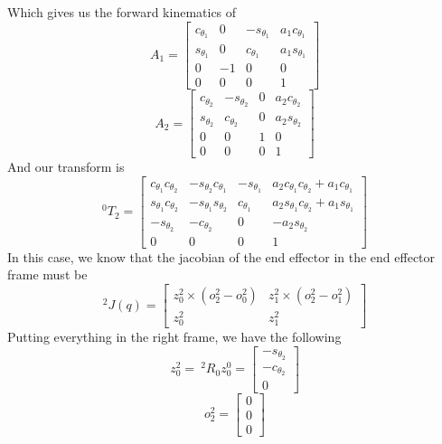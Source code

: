 \documentclass{../homework}
\begin{document}
\begin{solution}
\begin{parts}
     Which gives us the forward kinematics of
     \[
       A_1 = 
       \begin{bmatrix}
         c_{\theta_1} & 0 & -s_{\theta_1} & a_1c_{\theta_1} \\
         s_{\theta_1} & 0 & c_{\theta_1} & a_1s_{\theta_1} \\
         0 & -1 & 0 & 0 \\
         0 & 0 & 0 & 1
       \end{bmatrix}
     \]
     \[
       A_2 =
       \begin{bmatrix}
         c_{\theta_2} & -s_{\theta_2} & 0 & a_2c_{\theta_2} \\
         s_{\theta_2} & c_{\theta_2} & 0 & a_2s_{\theta_2} \\
         0 & 0 & 1 & 0 \\
         0 & 0 & 0 & 1
       \end{bmatrix}
     \]
     And our transform is
     \[
       ^0T_2 = 
       \begin{bmatrix}
         c_{\theta_1}c_{\theta_2} & -s_{\theta_2}c_{\theta_1} & - s_{\theta_1} & a_2c_{\theta_1}c_{\theta_2} + a_1c_{\theta_1} \\
         s_{\theta_1}c_{\theta_2} & -s_{\theta_1}s_{\theta_2} & c_{\theta_1} & a_2s_{\theta_1}c_{\theta_2} + a_1s_{\theta_1} \\
         -s_{\theta_2} & -c_{\theta_2} & 0 & -a_2s_{\theta_2} \\
         0 & 0 & 0 & 1
       \end{bmatrix}
     \]
     In this case, we know that the jacobian of the end effector in the end effector frame must be
     \[
      ^2J(q) = 
      \begin{bmatrix}
        z_0^2 \times (o^2_2 - o^2_0) & z_1^2 \times (o^2_2 - o^2_1) \\
        z_0^2 & z_1^2
      \end{bmatrix}
     \]
     Putting everything in the right frame, we have the following
     \[
       z_0^2 =\ ^2R_0z_0^0 =
       \begin{bmatrix}
         -s_{\theta_2} \\
         -c_{\theta_2} \\
         0
       \end{bmatrix}
     \]
     \[
       o_2^2 = \begin{bmatrix}
         0 \\
         0 \\
         0
       \end{bmatrix}
\]
\end{parts}
\end{solution}
\end{document}
